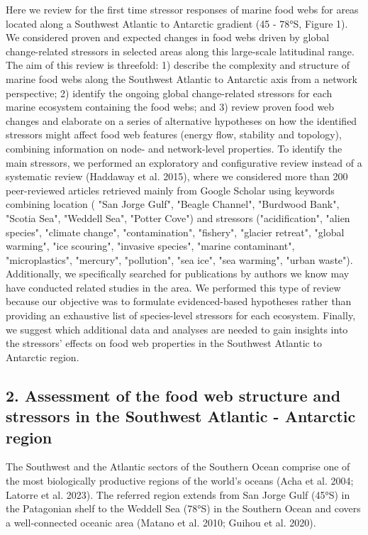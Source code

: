 \documentclass[
]{article}
\begin{document}
Here we review for the first time stressor responses of marine food webs
for areas located along a Southwest Atlantic to Antarctic gradient (45 -
78°S, Figure 1). We considered proven and expected changes in food webs
driven by global change-related stressors in selected areas along this
large-scale latitudinal range. The aim of this review is threefold: 1)
describe the complexity and structure of marine food webs along the
Southwest Atlantic to Antarctic axis from a network perspective; 2)
identify the ongoing global change-related stressors for each marine
ecosystem containing the food webs; and 3) review proven food web
changes and elaborate on a series of alternative hypotheses on how the
identified stressors might affect food web features (energy flow,
stability and topology), combining information on node- and
network-level properties. To identify the main stressors, we performed
an exploratory and configurative review instead of a systematic review
(Haddaway et al. 2015), where we considered more than 200 peer-reviewed 
articles retrieved mainly from Google Scholar using keywords combining 
location ( "San Jorge Gulf", "Beagle Channel", "Burdwood Bank", "Scotia Sea", 
"Weddell Sea", "Potter Cove") and stressors ("acidification", "alien species", 
"climate change", "contamination", "fishery", "glacier retreat", "global warming", 
"ice scouring", "invasive species", "marine contaminant", "microplastics", "mercury", 
"pollution", "sea ice", "sea warming", "urban waste"). Additionally, we 
specifically searched for publications by authors we know may have conducted 
related studies in the area. We performed this type of review because our 
objective was to formulate
evidenced-based hypotheses rather than providing an exhaustive list of
species-level stressors for each ecosystem. Finally, we suggest which
additional data and analyses are needed to gain insights into the
stressors' effects on food web properties in the Southwest Atlantic to
Antarctic region.

\subsection{2. Assessment of the food web structure and stressors in the
Southwest Atlantic - Antarctic
region}\label{assessment-of-the-food-web-structure-and-stressors-in-the-southwest-atlantic---antarctic-region}

The Southwest and the Atlantic sectors of the Southern Ocean comprise
one of the most biologically productive regions of the world's oceans
(Acha et al. 2004; Latorre et al. 2023). The referred region extends
from San Jorge Gulf (45°S) in the Patagonian shelf to the Weddell Sea
(78°S) in the Southern Ocean and covers a well-connected oceanic area
(Matano et al. 2010; Guihou et al. 2020).
\end{document}
